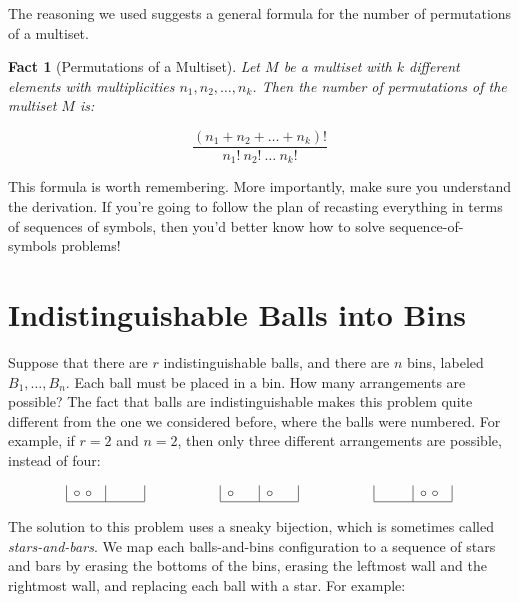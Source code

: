 \documentclass[twoside,12pt]{article}
\newtheorem{fact}{Fact}
\begin{document}
The reasoning we used suggests a general formula for the number of
permutations of a multiset.

\begin{fact}[Permutations of a Multiset]
Let $M$ be a multiset with $k$ different elements with multiplicities
$n_1, n_2, \ldots, n_k$.  Then the number of permutations of the
multiset $M$ is:

\[
\frac{(n_1 + n_2 + \ldots + n_k)!}{n_1!\ n_2!\ \ldots\ n_k!}
\]
\end{fact}

\noindent This formula is worth remembering.  More importantly, make
sure you understand the derivation.  If you're going to follow the
plan of recasting everything in terms of sequences of symbols, then
you'd better know how to solve sequence-of-symbols problems!

\section{Indistinguishable Balls into Bins}

Suppose that there are $r$ indistinguishable balls, and there are $n$
bins, labeled $B_1, \ldots, B_n$.  Each ball must be placed in a bin.
How many arrangements are possible?  The fact that balls are
indistinguishable makes this problem quite different from the one we
considered before, where the balls were numbered.  For example, if $r
= 2$ and $n = 2$, then only three different arrangements are possible,
instead of four:

\[
\begin{array}{|p{0.25in}|p{0.25in}|}
$\circ$ $\circ$ & \\ \hline
\end{array}
\hspace{0.75in}
\begin{array}{|p{0.25in}|p{0.25in}|}
$\circ$ & $\circ$ \\ \hline
\end{array}
\hspace{0.75in}
\begin{array}{|p{0.25in}|p{0.25in}|}
& $\circ$ $\circ$ \\ \hline
\end{array}
\]

The solution to this problem uses a sneaky bijection, which is
sometimes called {\em stars-and-bars}.  We map each balls-and-bins
configuration to a sequence of stars and bars by erasing the bottoms
of the bins, erasing the leftmost wall and the rightmost wall, and
replacing each ball with a star.  For example:
\end{document}
